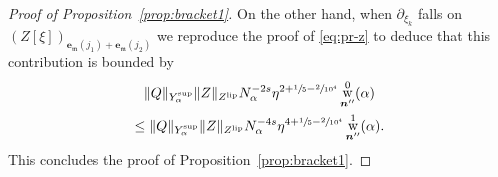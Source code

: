 \documentclass[JEP,XML,SOM,Unicode,published]{cedram}
\DeclareMathOperator{\rw}{w}
\theoremstyle{plain}
\theoremstyle{definition}
\newcommand{\nb}{{\boldsymbol n}}
\newcommand{\1}{\mathbf{1}}
\newcommand{\Ysup}[1]{Y_{#1}^{\mathrm{sup}}}
\begin{document}
\begin{proof}[Proof of Proposition~\ref{prop:bracket1}]
\pagebreak[2]
On the other hand, when $\partial_{\xi_{k}}$ falls on $(Z[\xi])_{\boldsymbol{e}_{\mathfrak{m}}(j_{1})+\boldsymbol{e}_{\mathfrak{m}}(j_{2})}$ we reproduce the proof of \eqref{eq:pr-z} to deduce that this contribution is bounded by
\begin{multline*}
\|Q\|_{\Ysup{\alpha}}
\| Z\|_{Z^{\mathrm{lip}}}
N_{\alpha}^{-2s}\eta^{2+\sfrac{1}{5}-\sfrac{2}{10^{4}}}
\rw_{\nb''}^{0}(\alpha)\\
\leq
\|Q\|_{\Ysup{\alpha}}
\| Z\|_{Z^{\mathrm{lip}}}
N_{\alpha}^{-4s}\eta^{4+\sfrac{1}{5}-\sfrac{2}{10^{4}}}
\rw_{\nb''}^{1}(\alpha).
\end{multline*}
This concludes the proof of Proposition~\ref{prop:bracket1}.
\end{proof}

\label{sub:d2F}
\end{document}
